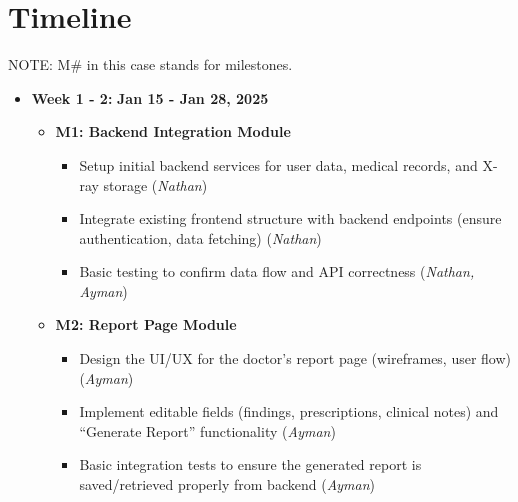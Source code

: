 \documentclass[12pt, titlepage]{article}
\newcommand{\rt}[1]{\textbf{#1}}
\begin{document}
\section{Timeline}
NOTE: M\# in this case stands for milestones.
\begin{itemize} \item \textbf{Week 1 - 2:} \rt{Jan 15 - Jan 28, 2025} \begin{itemize} \item \textbf{M1: Backend Integration Module} \begin{itemize} \item Setup initial backend services for user data, medical records, and X-ray storage (\textit{Nathan}) \item Integrate existing frontend structure with backend endpoints (ensure authentication, data fetching) (\textit{Nathan}) \item Basic testing to confirm data flow and API correctness (\textit{Nathan, Ayman}) \end{itemize} \item \textbf{M2: Report Page Module} \begin{itemize} \item Design the UI/UX for the doctor’s report page (wireframes, user flow) (\textit{Ayman}) \item Implement editable fields (findings, prescriptions, clinical notes) and “Generate Report” functionality (\textit{Ayman}) \item Basic integration tests to ensure the generated report is saved/retrieved properly from backend (\textit{Ayman}) \end{itemize} \end{itemize}


\end{itemize}
\end{document}
